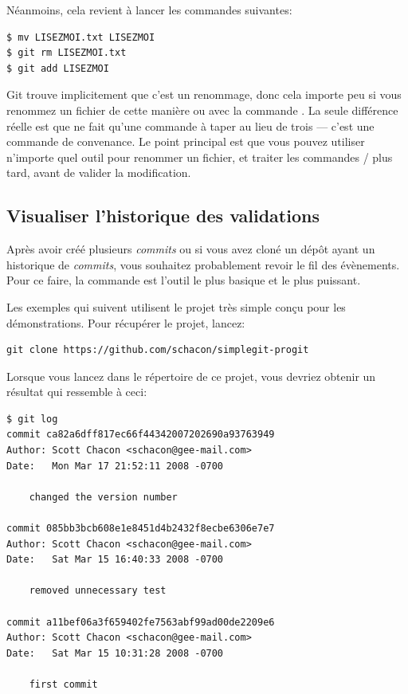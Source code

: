 Néanmoins, cela revient à lancer les commandes suivantes:
\begin{Schunk}
\begin{Verbatim}
$ mv LISEZMOI.txt LISEZMOI
$ git rm LISEZMOI.txt
$ git add LISEZMOI
\end{Verbatim}
\end{Schunk}

Git trouve implicitement que c'est un renommage, donc cela importe peu si vous renommez un fichier de cette manière ou avec la commande .
La seule différence réelle est que  ne fait qu'une commande à taper au lieu de trois --- c'est une commande de convenance.
Le point principal est que vous pouvez utiliser n'importe quel outil pour renommer un fichier, et traiter les commandes / plus tard, avant de valider la modification.

\subsection{Visualiser l'historique des validations}
\label{sec:git:viewing_history}

Après avoir créé plusieurs \emph{commits} ou si vous avez cloné un dépôt ayant un historique de \emph{commits}, vous souhaitez probablement revoir le fil des évènements.
Pour ce faire, la commande  est l'outil le plus basique et le plus puissant.

Les exemples qui suivent utilisent le projet très simple  conçu pour les démonstrations.
Pour récupérer le projet, lancez:
\begin{Schunk}
\begin{Verbatim}
git clone https://github.com/schacon/simplegit-progit
\end{Verbatim}
\end{Schunk}

Lorsque vous lancez  dans le répertoire de ce projet, vous devriez obtenir un résultat qui ressemble à ceci:
\begin{Schunk}
\begin{Verbatim}
$ git log
commit ca82a6dff817ec66f44342007202690a93763949
Author: Scott Chacon <schacon@gee-mail.com>
Date:   Mon Mar 17 21:52:11 2008 -0700

    changed the version number

commit 085bb3bcb608e1e8451d4b2432f8ecbe6306e7e7
Author: Scott Chacon <schacon@gee-mail.com>
Date:   Sat Mar 15 16:40:33 2008 -0700

    removed unnecessary test

commit a11bef06a3f659402fe7563abf99ad00de2209e6
Author: Scott Chacon <schacon@gee-mail.com>
Date:   Sat Mar 15 10:31:28 2008 -0700

    first commit
\end{Verbatim}
\end{Schunk}

